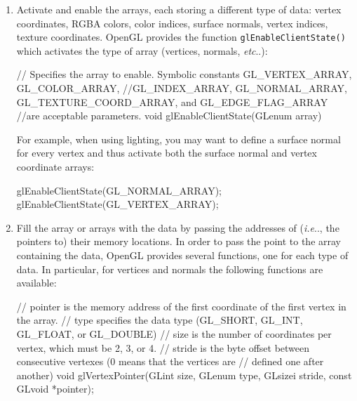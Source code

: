 \documentclass[a4paper,11pt]{article}
\makeatletter
\DeclareRobustCommand\onedot{\futurelet\@let@token\@onedot}
\def\@onedot{\ifx\@let@token.\else.\null\fi\xspace}
\def\ie{\emph{i.e}\onedot} \def\Ie{\emph{I.e}\onedot}
\def\etc{\emph{etc}\onedot} \def\vs{\emph{vs}\onedot}
\newcommand{\coden}[1]{\texttt{#1}}
\newcommand{\brand}[1]{\textsf{#1}\xspace}
\newcommand{\opengl}{\brand{OpenGL}}
\makeatother
\begin{document}
\begin{enumerate}
	\item Activate and enable the arrays, each storing a different type of data: vertex coordinates, RGBA colors, color indices, surface normals, vertex indices, texture coordinates. \opengl provides the function \coden{glEnableClientState()} which activates the type of array (vertices, normals, \etc):\\

{\smaller
\begin{cppcode}
// Specifies the array to enable. Symbolic constants GL_VERTEX_ARRAY, GL_COLOR_ARRAY, 
//GL_INDEX_ARRAY, GL_NORMAL_ARRAY, GL_TEXTURE_COORD_ARRAY, and GL_EDGE_FLAG_ARRAY 
//are acceptable parameters.
void glEnableClientState(GLenum array)
\end{cppcode}
}

\noindent For example, when using lighting, you may want to define a surface normal for every vertex and thus activate both the surface normal and vertex coordinate arrays:\\
{\smaller
\begin{cppcode}
glEnableClientState(GL_NORMAL_ARRAY);
glEnableClientState(GL_VERTEX_ARRAY);
\end{cppcode}
}	

	\item Fill the array or arrays with the data by passing the addresses of (\ie, the pointers to) their memory locations. In order to pass the point to the array containing the data, \opengl provides several functions, one for each type of data. In particular, for vertices and normals the following functions are available:\\
{\smaller
\begin{cppcode}
// pointer is the memory address of the first coordinate of the first vertex in the array. 
// type specifies the data type (GL_SHORT, GL_INT, GL_FLOAT, or GL_DOUBLE) 
// size is the number of coordinates per vertex, which must be 2, 3, or 4. 
// stride is the byte offset between consecutive vertexes (0 means that the vertices are 
// defined one after another)
void glVertexPointer(GLint size, GLenum type, GLsizei stride, const GLvoid *pointer);


\end{cppcode}}
\end{enumerate}
\end{document}
